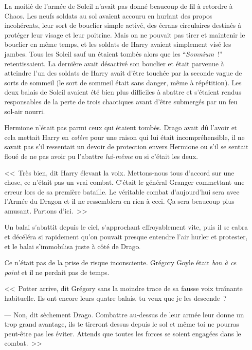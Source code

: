 La moitié de l'armée de Soleil n'avait pas donné beaucoup de fil à retordre à Chaos. Les neufs soldats au sol avaient accouru en hurlant des propos incohérents, leur sort de bouclier simple activé, des écrans circulaires destinés à protéger leur visage et leur poitrine. Mais on ne pouvait pas tirer et maintenir le bouclier en même temps, et les soldats de Harry avaient simplement visé les jambes. Tous les Soleil sauf un étaient tombés alors que les “\emph{Somnium}~!” retentissaient. La dernière avait désactivé son bouclier et était parvenue à atteindre l'un des soldats de Harry avait d'être touchée par la seconde vague de sorts de sommeil (le sort de sommeil était sans danger, même à répétition). Les deux balais de Soleil avaient été bien plus difficiles à abattre et s'étaient rendus responsables de la perte de trois chaotiques avant d'être submergés par un feu sol-air nourri.

Hermione n'était pas parmi ceux qui étaient tombés. Drago avait dû l'avoir et cela mettait Harry en \emph{colère} pour une raison qui lui était incompréhensible, il ne savait pas s'il ressentait un devoir de protection envers Hermione ou s'il se sentait floué de ne pas avoir pu l'abattre \emph{lui-même} ou si c'était les deux.

<<~Très bien, dit Harry élevant la voix. Mettons-nous tous d'accord sur une chose, ce n'était pas un vrai combat. C'était le général Granger commettant une erreur lors de sa première bataille. Le véritable combat d'aujourd'hui sera avec l'Armée du Dragon et il ne ressemblera en rien à ceci. Ça sera beaucoup plus amusant. Partons d'ici.~>>

\later

Un balai s'abattit depuis le ciel, s'approchant effroyablement vite, puis il se cabra et décéléra si rapidement qu'on pouvait presque entendre l'air hurler et protester, et le balai s'immobilisa juste à côté de Drago.

Ce n'était pas de la prise de risque inconsciente. Grégory Goyle était \emph{bon à ce point} et il ne perdait pas de temps.

<<~Potter arrive, dit Grégory sans la moindre trace de sa fausse voix traînante habituelle. Ils ont encore leurs quatre balais, tu veux que je les descende~?

--- Non, dit sèchement Drago. Combattre au-dessus de leur armée leur donne un trop grand avantage, ils te tireront dessus depuis le sol et même toi ne pourras peut-être pas les éviter. Attends que toutes les forces se soient engagées dans le combat.~>>

